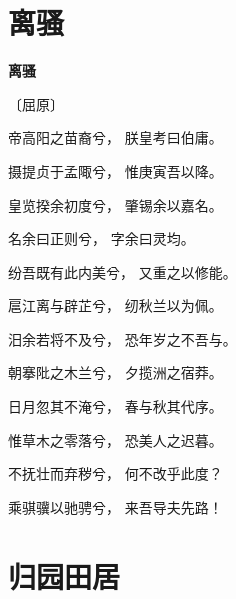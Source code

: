 \documentclass[12pt,UTF-8,openany,fontset=none]{ctexbook}
\begin{document}
\vspace{8pt}
\clearpage

\section{离骚}


\begin{center}
    {\bfseries 离骚}

    \vspace{18pt}

    \begin{large}\xuwen
        〔屈原〕
    \end{large}

\end{center}

    \vspace{18pt}  %

\begin{center}
    \begin{Large}

        帝高阳之苗裔兮， 朕皇考曰伯庸。

        摄提贞于孟陬兮， 惟庚寅吾以降。

        皇览揆余初度兮， 肇锡余以嘉名。

        名余曰正则兮， 字余曰灵均。

        纷吾既有此内美兮， 又重之以修能。\hspace{5pt}

        扈江离与辟芷兮， 纫秋兰以为佩。

        \hspace{18pt}汨余若将不及兮， 恐年岁之不吾与。

        朝搴阰之木兰兮， 夕揽洲之宿莽。

        日月忽其不淹兮， 春与秋其代序。

        惟草木之零落兮， 恐美人之迟暮。

        不抚壮而弃秽兮， 何不改乎此度？

        乘骐骥以驰骋兮， 来吾导夫先路！

    \end{Large}

\end{center}

\vspace{8pt}
\clearpage

\section{归园田居}
\end{document}
